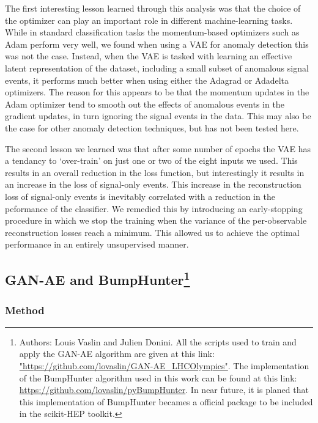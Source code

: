\documentclass[a4paper,11pt]{article}
\begin{document}
\noindent The first interesting lesson learned through this analysis was that the choice of the optimizer can play an important role in different machine-learning tasks.
While in standard classification tasks the momentum-based optimizers such as Adam perform very well, we found when using a VAE for anomaly detection this was not the case.
Instead, when the VAE is tasked with learning an effective latent representation of the dataset, including a small subset of anomalous signal events, it performs much better when using either the Adagrad or Adadelta optimizers.
The reason for this appears to be that the momentum updates in the Adam optimizer tend to smooth out the effects of anomalous events in the gradient updates, in turn ignoring the signal events in the data.
This may also be the case for other anomaly detection techniques, but has not been tested here.

The second lesson we learned was that after some number of epochs the VAE has a tendancy to `over-train' on just one or two of the eight inputs we used.
This results in an overall reduction in the loss function, but interestingly it results in an increase in the loss of signal-only events.
This increase in the reconstruction loss of signal-only events is inevitably correlated with a reduction in the peformance of the classifier.
We remedied this by introducing an early-stopping procedure in which we stop the training when the variance of the per-observable reconstruction losses reach a minimum.
This allowed us to achieve the optimal performance in an entirely unsupervised manner.



 \FloatBarrier

\subsection[GAN-AE and BumpHunter]{GAN-AE and BumpHunter\footnote{Authors: Louis Vaslin and Julien Donini.  All the scripts used to train and apply the GAN-AE algorithm are given at this link: \href{"https://github.com/lovaslin/GAN-AE\_LHCOlympics"}{"https://github.com/lovaslin/GAN-AE\_LHCOlympics"}.  The implementation of the BumpHunter algorithm used in this work can be found at this link: \href{https://github.com/lovaslin/pyBumpHunter}{https://github.com/lovaslin/pyBumpHunter}. In near future, it is planed that this implementation of BumpHunter becames a official package to be included in the scikit-HEP toolkit.}}
\label{sec:GAN-AE}

\subsubsection{Method}
\label{sec:method}
\end{document}
